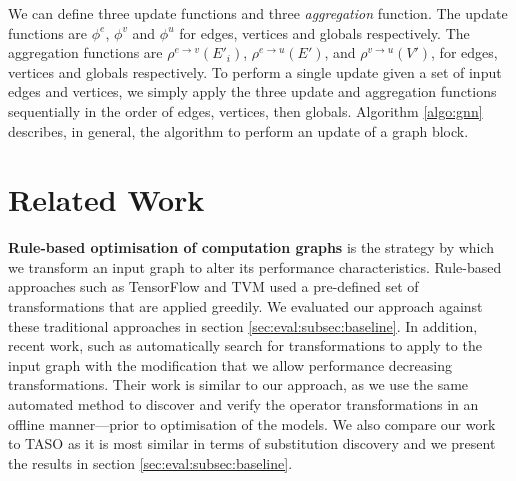 We can define three update functions and three \textit{aggregation} function. The update functions are $\phi^e$, $\phi^v$ and $\phi^u$ for edges, vertices and globals respectively. The aggregation functions are $\rho^{e \rightarrow v} (E'_i)$, $\rho^{e \rightarrow u} (E')$, and $\rho^{v \rightarrow u} (V')$, for edges, vertices and globals respectively. To perform a single update given a set of input edges and vertices, we simply apply the three update and aggregation functions sequentially in the order of edges, vertices, then globals. Algorithm \ref{algo:gnn} describes, in general, the algorithm to perform an update of a graph block.



\section{Related Work}

\textbf{Rule-based optimisation of computation graphs} is the strategy by which we transform an input graph to alter its performance characteristics. Rule-based approaches such as TensorFlow \cite{tensorflow2015-whitepaper} and TVM \cite{chen2018tvm} used a pre-defined set of transformations that are applied greedily. We evaluated our approach against these traditional approaches in section \ref{sec:eval:subsec:baseline}. In addition, recent work, such as \cite{jia2019optimizing,jia2019taso} automatically search for transformations to apply to the input graph with the modification that we allow performance decreasing transformations. Their work is similar to our approach, as we use the same automated method to discover and verify the operator transformations in an offline manner---prior to optimisation of the models. We also compare our work to TASO \cite{jia2019taso} as it is most similar in terms of substitution discovery and we present the results in section \ref{sec:eval:subsec:baseline}.


